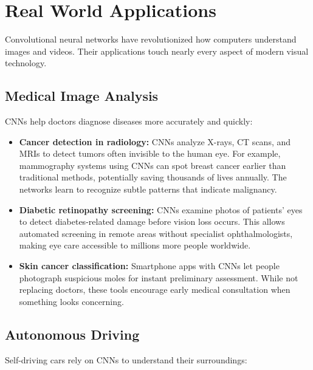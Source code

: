 
\section{Real World Applications}
\label{sec:cnn-real-world}


Convolutional neural networks have revolutionized how computers understand images and videos. Their applications touch nearly every aspect of modern visual technology.

\subsection{Medical Image Analysis}

CNNs help doctors diagnose diseases more accurately and quickly:

\begin{itemize}
    \item \textbf{Cancer detection in radiology:} CNNs analyze X-rays, CT scans, and MRIs to detect tumors often invisible to the human eye. For example, mammography systems using CNNs can spot breast cancer earlier than traditional methods, potentially saving thousands of lives annually. The networks learn to recognize subtle patterns that indicate malignancy.
    
    \item \textbf{Diabetic retinopathy screening:} CNNs examine photos of patients' eyes to detect diabetes-related damage before vision loss occurs. This allows automated screening in remote areas without specialist ophthalmologists, making eye care accessible to millions more people worldwide.
    
    \item \textbf{Skin cancer classification:} Smartphone apps with CNNs let people photograph suspicious moles for instant preliminary assessment. While not replacing doctors, these tools encourage early medical consultation when something looks concerning.
\end{itemize}

\subsection{Autonomous Driving}

Self-driving cars rely on CNNs to understand their surroundings:

